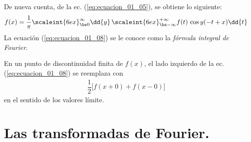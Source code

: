 De nueva cuenta, de la ec. (\ref{eq:ecuacion_01_05}), se obtiene lo siguiente:
\begin{align}
f (x) = \dfrac{1}{\pi} \scaleint{6ex}_{\bs 0}^{\infty}  \dd{y} \, \scaleint{6ex}_{\bs -\infty}^{+\infty} f (t) \, \cos y (-t + x) \dd{t} \label{eq:ecuacion_01_08}
\end{align}
La ecuación (\ref{eq:ecuacion_01_08}) se le conoce como la \emph{fórmula integral de Fourier}.
\par
En un punto de discontinuidad finita de $f (x)$, el lado izquierdo de la ec. (\ref{eq:ecuacion_01_08}) se reemplaza con
\begin{align*}
\dfrac{1}{2} \big[ f (x + 0) + f (x - 0) \big]
\end{align*}
en el sentido de los valores límite.

\section{Las transformadas de Fourier.}

